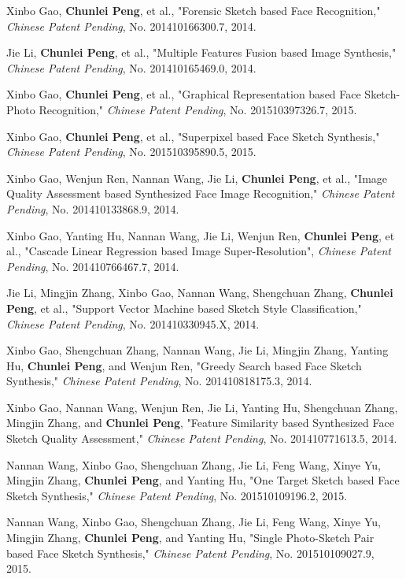 \documentclass[11pt]{article}
\begin{document}
\begin{bibenum}

\item Xinbo Gao, \textbf{Chunlei Peng}, et al., "Forensic Sketch based Face Recognition," \emph{Chinese Patent Pending}, No. 201410166300.7, 2014.

\item Jie Li, \textbf{Chunlei Peng}, et al., "Multiple Features Fusion based Image Synthesis," \emph{Chinese Patent Pending}, No. 201410165469.0, 2014.

\item Xinbo Gao, \textbf{Chunlei Peng}, et al., "Graphical Representation based Face Sketch-Photo Recognition," \emph{Chinese Patent Pending}, No. 201510397326.7, 2015.

\item Xinbo Gao, \textbf{Chunlei Peng}, et al., "Superpixel based Face Sketch Synthesis," \emph{Chinese Patent Pending}, No. 201510395890.5, 2015.

\item Xinbo Gao, Wenjun Ren, Nannan Wang, Jie Li, \textbf{Chunlei Peng}, et al., "Image Quality Assessment based Synthesized Face Image Recognition," \emph{Chinese Patent Pending}, No. 201410133868.9, 2014.

\item Xinbo Gao, Yanting Hu, Nannan Wang, Jie Li, Wenjun Ren, \textbf{Chunlei Peng}, et al., "Cascade Linear Regression based Image Super-Resolution", \emph{Chinese Patent Pending}, No. 201410766467.7, 2014.

\item Jie Li, Mingjin Zhang, Xinbo Gao, Nannan Wang, Shengchuan Zhang, \textbf{Chunlei Peng}, et al., "Support Vector Machine based Sketch Style Classification," \emph{Chinese Patent Pending}, No. 201410330945.X, 2014.

\item Xinbo Gao, Shengchuan Zhang, Nannan Wang, Jie Li, Mingjin Zhang, Yanting Hu, \textbf{Chunlei Peng}, and Wenjun Ren, "Greedy Search based Face Sketch Synthesis," \emph{Chinese Patent Pending}, No. 201410818175.3, 2014.

\item Xinbo Gao, Nannan Wang, Wenjun Ren, Jie Li, Yanting Hu, Shengchuan Zhang, Mingjin Zhang, and \textbf{Chunlei Peng}, "Feature Similarity based Synthesized Face Sketch Quality Assessment," \emph{Chinese Patent Pending}, No. 201410771613.5, 2014.

\item Nannan Wang, Xinbo Gao, Shengchuan Zhang, Jie Li, Feng Wang, Xinye Yu, Mingjin Zhang, \textbf{Chunlei Peng}, and Yanting Hu, "One Target Sketch based Face Sketch Synthesis," \emph{Chinese Patent Pending}, No. 201510109196.2, 2015.

\item Nannan Wang, Xinbo Gao, Shengchuan Zhang, Jie Li, Feng Wang, Xinye Yu, Mingjin Zhang, \textbf{Chunlei Peng}, and Yanting Hu, "Single Photo-Sketch Pair based Face Sketch Synthesis," \emph{Chinese Patent Pending}, No. 201510109027.9, 2015.

\end{bibenum}
\end{document}
